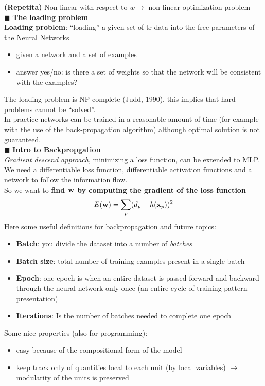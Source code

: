 \documentclass[../main.tex]{subfiles}
\begin{document}
\textbf{(Repetita)} Non-linear with respect to $w \rightarrow$ non linear optimization problem\\

\noindent$\blacksquare$ \textbf{The loading problem}\\
\textbf{Loading problem}: “loading” a given set of tr data into the free parameters of the Neural Networks
\begin{itemize}
    \item given a network and a set of examples
    \item answer yes/no: is there a set of weights so that the network will be consistent with the examples?
\end{itemize}
The loading problem is NP-complete (Judd, 1990), this implies that hard problems cannot be “solved”.\\

In practice networks can be trained in a reasonable amount of time (for example with the use of the back-propagation algorithm) although optimal solution is not guaranteed.\\

\newpage
\noindent$\blacksquare$ \textbf{Intro to Backpropgation}\\
\emph{Gradient descend approach}, minimizing a loss function, can be extended to MLP. We need a differentiable loss function, differentiable activation functions and a network to follow the information flow.\\

\noindent So we want to \textbf{find $\bold{w}$ by computing the gradient of the loss function}
$$E(\bold{w})=\sum_{p}(d_p-h(\bold{x}_p))^2$$
Here some useful definitions for backpropagation and future topics:
\begin{itemize}
    \item \textbf{Batch}: you divide the dataset into a number of \emph{batches}
    \item \textbf{Batch size}: total number of training examples present in a single batch
    \item \textbf{Epoch}: one epoch is when an entire dataset is passed forward and backward through the neural network only once (an entire cycle of training pattern presentation)
    \item \textbf{Iterations}: Is the number of batches needed to complete one epoch
\end{itemize}
Some nice properties (also for programming):
\begin{itemize}
    \item easy because of the compositional form of the model
    \item keep track only of quantities local to each unit (by local variables) $\rightarrow$ modularity of the units is preserved
\end{itemize}
\end{document}
